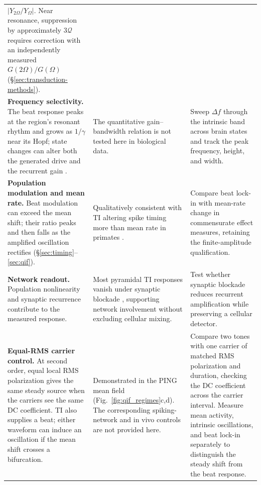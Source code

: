 \begin{longtable}{@{}>{\raggedright\arraybackslash}p{}
 >{\raggedright\arraybackslash}p{}
 >{\raggedright\arraybackslash}p{}@{}}
$|Y_{2\Omega}/Y_\Omega|$. Near resonance, suppression by approximately
$3\mathcal Q$ requires correction with an independently measured
$G(2\Omega)/G(\Omega)$ (\S\ref{sec:transduction-methods}). \\[4pt]
\textbf{Frequency selectivity.} The beat response peaks at the region's resonant
rhythm and grows as $1/\gamma$ near its Hopf; state changes can alter both the
generated drive and the recurrent gain \cite{ruffini2025cfc}.
& The quantitative gain--bandwidth relation is not tested here in biological data.
& Sweep $\Delta f$ through the intrinsic band across brain states and track the
peak frequency, height, and width. \\[4pt]
\textbf{Population modulation and mean rate.} Beat modulation can exceed the mean shift; their ratio
peaks and then falls as the amplified oscillation rectifies
(\S\ref{sec:timing}--\ref{sec:qif}).
& Qualitatively consistent with TI altering spike timing more than mean rate in
primates \cite{vieira2024}.
& Compare beat lock-in with mean-rate change in commensurate effect measures,
retaining the finite-amplitude qualification. \\[4pt]
\textbf{Network readout.} Population nonlinearity and synaptic recurrence contribute
to the measured response.
& Most pyramidal TI responses vanish under synaptic blockade \cite{caldas2024},
supporting network involvement without excluding cellular mixing.
& Test whether synaptic blockade reduces recurrent amplification while preserving
a cellular detector. \\[4pt]
\textbf{Equal-RMS carrier control.} At second order, equal local RMS
polarization gives the same steady source when the carriers see the same DC
coefficient. TI also supplies a beat; either waveform can induce an oscillation
if the mean shift crosses a bifurcation.
& Demonstrated in the PING mean field (Fig.~\ref{fig:qif_regimes}c,d).
The corresponding spiking-network and in vivo controls are not provided here.
& Compare two tones with one carrier of matched RMS polarization and duration,
checking the DC coefficient across the carrier interval. Measure mean activity,
intrinsic oscillations, and beat lock-in separately to distinguish the steady
shift from the beat response. \\
\end{longtable}
\endgroup
